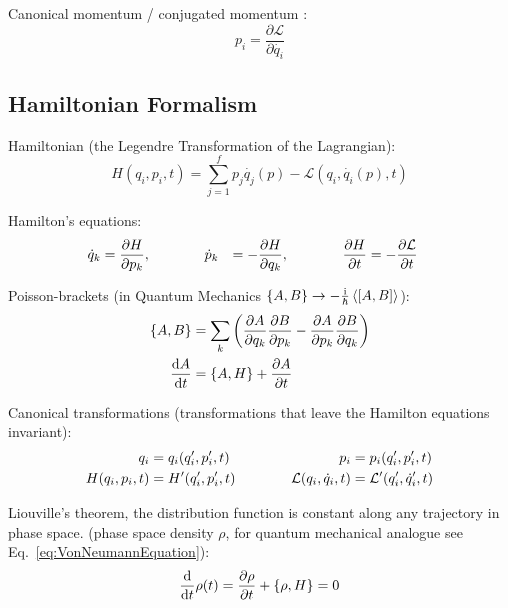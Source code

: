 		\noindent
		Canonical momentum / conjugated momentum :
		\begin{equation}
			p_i=\frac{\partial \mathcal{L}}{\partial\dot{q_i}}
		\end{equation}

	\subsection{Hamiltonian Formalism}
		\noindent
		Hamiltonian (\ie the Legendre Transformation of the Lagrangian):
		\begin{equation}
			H(q_i,p_i,t)=\sum_{j=1}^{f}p_j\dot{q_j}(p) - \mathcal{L}(q_i, \dot{q_i}(p),t)
		\end{equation}

		\noindent
		Hamilton's equations:
		\begin{equation}
			\begin{aligned}
				\dot{q}_k &= \pdv{H}{p_k}, &&\hspace{30pt}
				\dot{p}_k &= -\pdv{H}{q_k}, &&\hspace{30pt}
				\pdv{H}{t} &= -\pdv{\mathcal{L}}{t}
			\end{aligned}
		\end{equation}

		\noindent
		Poisson-brackets (in Quantum Mechanics $\qty{A,B} \rightarrow -\frac{\i}{\hbar}\Avg{\comm{A}{B}}$):
		\begin{equation}
			\begin{aligned}
				\qty{A,B} &= \sum_k \left(
				\pdv{A}{q_k}\pdv{B}{p_k} - \pdv{A}{p_k}\pdv{B}{q_k}
				\right) \\
				\dv{A}{t} &= \qty{A, H} + \pdv{A}{t}
			\end{aligned}
		\end{equation}

		\noindent
		Canonical transformations (transformations that leave the Hamilton equations invariant):
		\begin{equation}
			\begin{aligned}
				q_i &= q_i(q_i',p_i',t) &\hspace{30pt}
				p_i &= p_i(q_i',p_i',t) \\
				H(q_i,p_i,t) &= H'(q_i',p_i',t) &\hspace{30pt}
				\mathcal{L}(q_i,\dot{q}_i,t) &= \mathcal{L}'(q_i',\dot{q}_i',t) \\
			\end{aligned}
		\end{equation}

		\noindent
		Liouville's theorem, \ie the distribution function is constant along any trajectory in phase space. (phase space density $\rho$, for quantum mechanical analogue see Eq.~\ref{eq:VonNeumannEquation}):
		\begin{equation}
			\label{eq:LiouvilleTheorem}
			\dv{t} \rho(t) = \pdv{\rho}{t} + \qty{\rho, H} = 0
		\end{equation}


